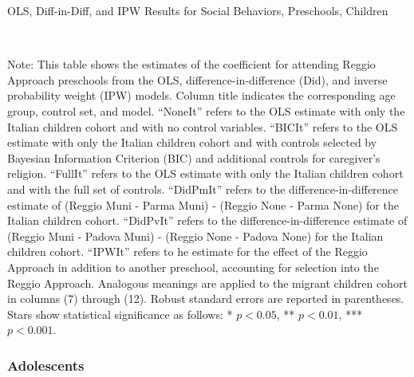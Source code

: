 \begin{landscape}
\begin{table}[H] \caption{OLS, Diff-in-Diff, and IPW Results for Social Behaviors, Preschools, Children} \label{ols-H-reg}
\scalebox{0.77}{
}
\vspace{1ex} \\
\footnotesize\raggedright{Note: This table shows the estimates of the coefficient for attending Reggio Approach preschools from the OLS, difference-in-difference (Did), and inverse probability weight (IPW) models. Column title indicates the corresponding age group, control set, and model. ``NoneIt'' refers to the OLS estimate with only the Italian children cohort and with no control variables. ``BICIt'' refers to the OLS estimate with only the Italian children cohort and with controls selected by Bayesian Information Criterion (BIC) and additional controls for caregiver's religion. ``FullIt'' refers to the OLS estimate with only the Italian children cohort and with the full set of controls. ``DidPmIt'' refers to the difference-in-difference estimate of (Reggio Muni - Parma Muni) - (Reggio None - Parma None) for the Italian children cohort. ``DidPvIt'' refers to the difference-in-difference estimate of (Reggio Muni - Padova Muni) - (Reggio None - Padova None) for the Italian children cohort. ``IPWIt'' refers to he estimate for the effect of the Reggio Approach in addition to another preschool, accounting for selection into the Reggio Approach. Analogous meanings are applied to the migrant children cohort in columns (7) through (12). Robust standard errors are reported in parentheses. Stars show statistical significance as follows: * $p < 0.05$, ** $p < 0.01$, *** $p < 0.001$.}
\end{table}
\end{landscape}


\subsubsection{Adolescents}

